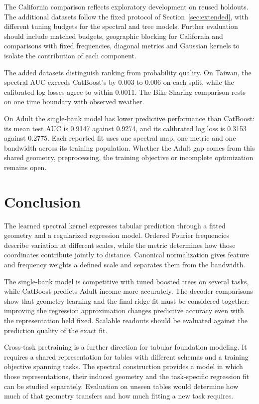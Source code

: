 \documentclass[11pt]{article}
\begin{document}
The California comparison reflects exploratory development on reused holdouts. The additional datasets follow the fixed protocol of Section~\ref{sec:extended}, with different tuning budgets for the spectral and tree models. Further evaluation should include matched budgets, geographic blocking for California and comparisons with fixed frequencies, diagonal metrics and Gaussian kernels to isolate the contribution of each component.

The added datasets distinguish ranking from probability quality. On Taiwan, the spectral AUC exceeds CatBoost's by 0.003 to 0.006 on each split, while the calibrated log losses agree to within 0.0011. The Bike Sharing comparison rests on one time boundary with observed weather.

On Adult the single-bank model has lower predictive performance than CatBoost: its mean test AUC is 0.9147 against 0.9274, and its calibrated log loss is 0.3153 against 0.2775. Each reported fit uses one spectral map, one metric and one bandwidth across its training population. Whether the Adult gap comes from this shared geometry, preprocessing, the training objective or incomplete optimization remains open.

\section{Conclusion}
The learned spectral kernel expresses tabular prediction through a fitted geometry and a regularized regression model. Ordered Fourier frequencies describe variation at different scales, while the metric determines how those coordinates contribute jointly to distance. Canonical normalization gives feature and frequency weights a defined scale and separates them from the bandwidth.

The single-bank model is competitive with tuned boosted trees on several tasks, while CatBoost predicts Adult income more accurately. The decoder comparisons show that geometry learning and the final ridge fit must be considered together: improving the regression approximation changes predictive accuracy even with the representation held fixed. Scalable readouts should be evaluated against the prediction quality of the exact fit.

Cross-task pretraining is a further direction for tabular foundation modeling. It requires a shared representation for tables with different schemas and a training objective spanning tasks. The spectral construction provides a model in which those representations, their induced geometry and the task-specific regression fit can be studied separately. Evaluation on unseen tables would determine how much of that geometry transfers and how much fitting a new task requires.
\end{document}
